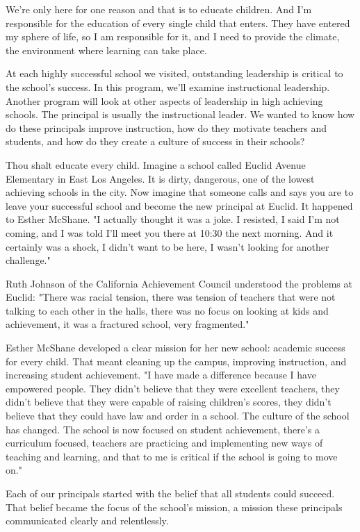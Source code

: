 We're only here for one reason and that is to educate children.
And I'm responsible for the education of every single child that enters.
They have entered my sphere of life, so I am responsible for it, and I need to provide the climate, the environment where learning can take place.

At each highly successful school we visited, outstanding leadership is critical to the school's success.
In this program, we'll examine instructional leadership.
Another program will look at other aspects of leadership in high achieving schools.
The principal is usually the instructional leader.
We wanted to know how do these principals improve instruction, how do they motivate teachers and students, and how do they create a culture of success in their schools?

Thou shalt educate every child.
Imagine a school called Euclid Avenue Elementary in East Los Angeles.
It is dirty, dangerous, one of the lowest achieving schools in the city.
Now imagine that someone calls and says you are to leave your successful school and become the new principal at Euclid.
It happened to Esther McShane.
"I actually thought it was a joke.
I resisted, I said I'm not coming, and I was told I'll meet you there at 10:30 the next morning.
And it certainly was a shock, I didn't want to be here, I wasn't looking for another challenge."

Ruth Johnson of the California Achievement Council understood the problems at Euclid: "There was racial tension, there was tension of teachers that were not talking to each other in the halls, there was no focus on looking at kids and achievement, it was a fractured school, very fragmented."

Esther McShane developed a clear mission for her new school: academic success for every child.
That meant cleaning up the campus, improving instruction, and increasing student achievement.
"I have made a difference because I have empowered people.
They didn't believe that they were excellent teachers, they didn't believe that they were capable of raising children's scores, they didn't believe that they could have law and order in a school.
The culture of the school has changed.
The school is now focused on student achievement, there's a curriculum focused, teachers are practicing and implementing new ways of teaching and learning, and that to me is critical if the school is going to move on."

Each of our principals started with the belief that all students could succeed.
That belief became the focus of the school's mission, a mission these principals communicated clearly and relentlessly.


